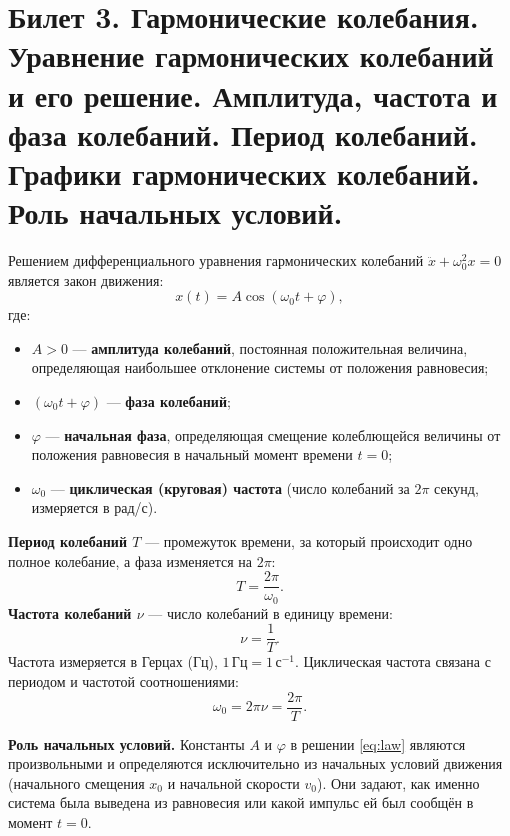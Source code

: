 \section{Билет 3. Гармонические колебания. Уравнение гармонических колебаний и его решение. Амплитуда, частота и фаза колебаний. Период колебаний. Графики гармонических колебаний. Роль начальных условий.}

\begin{definition}
Решением дифференциального уравнения гармонических колебаний $\ddot{x} + \omega_0^2 x = 0$ является закон движения:
\begin{equation}
    x(t) = A \cos(\omega_0 t + \varphi), \label{eq:law}
\end{equation}
где:
\begin{itemize}
    \item $A > 0$ --- \textbf{амплитуда колебаний}, постоянная положительная величина, определяющая наибольшее отклонение системы от положения равновесия;
    \item $(\omega_0 t + \varphi)$ --- \textbf{фаза колебаний};
    \item $\varphi$ --- \textbf{начальная фаза}, определяющая смещение колеблющейся величины от положения равновесия в начальный момент времени $t=0$;
    \item $\omega_0$ --- \textbf{циклическая (круговая) частота} (число колебаний за $2\pi$ секунд, измеряется в рад/с).
\end{itemize}
\end{definition}

\begin{property}
\textbf{Период колебаний $T$} --- промежуток времени, за который происходит одно полное колебание, а фаза изменяется на $2\pi$:
\begin{equation}
    T = \frac{2\pi}{\omega_0}.
\end{equation}
\textbf{Частота колебаний $\nu$} --- число колебаний в единицу времени:
\begin{equation}
    \nu = \frac{1}{T}.
\end{equation}
Частота измеряется в Герцах (Гц), $1\,\text{Гц} = 1\,\text{с}^{-1}$. Циклическая частота связана с периодом и частотой соотношениями:
\begin{equation}
    \omega_0 = 2\pi\nu = \frac{2\pi}{T}.
\end{equation}
\end{property}

\begin{remark}
\textbf{Роль начальных условий.} Константы $A$ и $\varphi$ в решении \eqref{eq:law} являются произвольными и определяются исключительно из начальных условий движения (начального смещения $x_0$ и начальной скорости $v_0$). Они задают, как именно система была выведена из равновесия или какой импульс ей был сообщён в момент $t=0$.
\end{remark}

